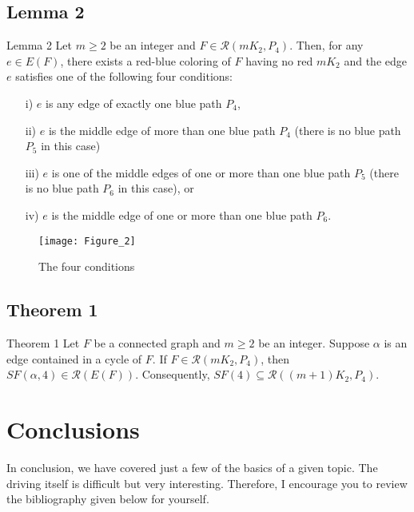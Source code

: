 \documentclass{beamer}
\theoremstyle{definition}
\begin{document}
\subsection{Lemma 2}
\begin{frame}
		{
			\begin{block}{Lemma 2}
			Let $m\geq 2$ be an integer and $F\in\mathcal{R}(mK_2,P_4)$. Then, for any $e\in E(F)$, there exists a red-blue coloring of $F$ having no red $mK_2$ and the edge $e$ satisfies one of the following four conditions:
			\begin{enumerate}
				\item[i)] $e$ is any edge of exactly one blue path $P_4$,
				\item[ii)] $e$ is the middle edge of more than one blue path $P_4$ (there is no blue path $P_5$ in this case)
				\item[iii)] $e$ is one of the middle edges of one or more than one blue path $P_5$ (there is no blue path $P_6$ in this case), or
				\item[iv)] $e$ is the middle edge of one or more than one blue path $P_6$. \textup{\cite{1}}
			\end{enumerate}
			\end{block}
		}
\end{frame}
\begin{frame}
		\begin{figure}[h]
			\centering
			\texttt{[image: Figure\_2]}
			\caption{The four conditions}
			\label{fig:f2}
		\end{figure}
\end{frame}
	\subsection{Theorem 1}
\begin{frame}
	{
		\begin{block}{Theorem 1}
			Let $F$ be a connected graph and $m\geq2$ be an integer. Suppose $\alpha$ is an edge contained in a cycle of $F$. If $F\in\mathcal{R}(mK_2,P_4)$, then $SF(\alpha,4)\in\mathcal{R}(E(F))$. Consequently, $SF(4)\subseteq\mathcal{R}\left( (m+1)K_2,P_4 \right).$ \textup{\cite{1}}
		\end{block}
	}
\end{frame}
\section{Conclusions}
\begin{frame}
	In conclusion, we have covered just a few of the basics of a given topic. The driving itself is difficult but very interesting. Therefore, I encourage you to review the bibliography given below for yourself.
\end{frame}
		
\end{document}
